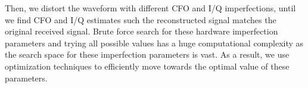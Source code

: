 Then, we distort the waveform with different CFO and
I/Q imperfections, until we find CFO and I/Q estimates such the %
reconstructed
signal matches the original received signal. Brute force search for these
hardware imperfection parameters and trying all possible values has a huge
computational complexity as the search space for these imperfection parameters
is vast. As a result, we use optimization techniques to efficiently move
towards the optimal value of these parameters.




%

%
%

